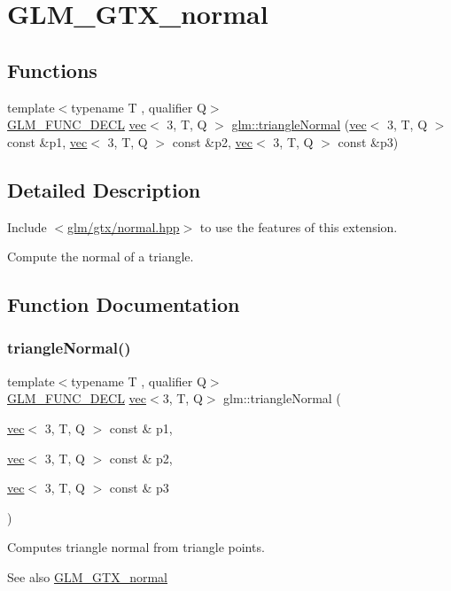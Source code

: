 \hypertarget{group__gtx__normal}{}\section{G\+L\+M\+\_\+\+G\+T\+X\+\_\+normal}
\label{group__gtx__normal}
\subsection*{Functions}
\begin{DoxyCompactItemize}
\item 
{\footnotesize template$<$typename T , qualifier Q$>$ }\\\mbox{\hyperlink{setup_8hpp_ab2d052de21a70539923e9bcbf6e83a51}{G\+L\+M\+\_\+\+F\+U\+N\+C\+\_\+\+D\+E\+CL}} \mbox{\hyperlink{structglm_1_1vec}{vec}}$<$ 3, T, Q $>$ \mbox{\hyperlink{group__gtx__normal_gaff1cb5496925dfa7962df457772a7f35}{glm\+::triangle\+Normal}} (\mbox{\hyperlink{structglm_1_1vec}{vec}}$<$ 3, T, Q $>$ const \&p1, \mbox{\hyperlink{structglm_1_1vec}{vec}}$<$ 3, T, Q $>$ const \&p2, \mbox{\hyperlink{structglm_1_1vec}{vec}}$<$ 3, T, Q $>$ const \&p3)
\end{DoxyCompactItemize}


\subsection{Detailed Description}
Include $<$\mbox{\hyperlink{normal_8hpp}{glm/gtx/normal.\+hpp}}$>$ to use the features of this extension.

Compute the normal of a triangle. 

\subsection{Function Documentation}
\mbox{\label{group__gtx__normal_gaff1cb5496925dfa7962df457772a7f35}} 
\subsubsection{\texorpdfstring{triangle\+Normal()}{triangleNormal()}}
{\footnotesize\ttfamily template$<$typename T , qualifier Q$>$ \\
\mbox{\hyperlink{setup_8hpp_ab2d052de21a70539923e9bcbf6e83a51}{G\+L\+M\+\_\+\+F\+U\+N\+C\+\_\+\+D\+E\+CL}} \mbox{\hyperlink{structglm_1_1vec}{vec}}$<$3, T, Q$>$ glm\+::triangle\+Normal (\begin{DoxyParamCaption}\item[{\mbox{\hyperlink{structglm_1_1vec}{vec}}$<$ 3, T, Q $>$ const \&}]{p1,  }\item[{\mbox{\hyperlink{structglm_1_1vec}{vec}}$<$ 3, T, Q $>$ const \&}]{p2,  }\item[{\mbox{\hyperlink{structglm_1_1vec}{vec}}$<$ 3, T, Q $>$ const \&}]{p3 }\end{DoxyParamCaption})}

Computes triangle normal from triangle points.

\begin{DoxySeeAlso}{See also}
\mbox{\hyperlink{group__gtx__normal}{G\+L\+M\+\_\+\+G\+T\+X\+\_\+normal}} 
\end{DoxySeeAlso}
